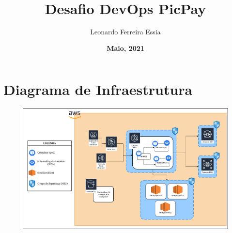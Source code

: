 \documentclass{article}
\title{\textbf{Desafio DevOps PicPay}}
\author{Leonardo Ferreira Essia}
\date{\textbf{Maio, 2021}}
\begin{document}
    \maketitle

    \section{Diagrama de Infraestrutura}
        \begin{figure}[h]
            \centering
            \includegraphics[width=1\textwidth]{img/diagrama.pdf}
        \end{figure}
\end{document}
